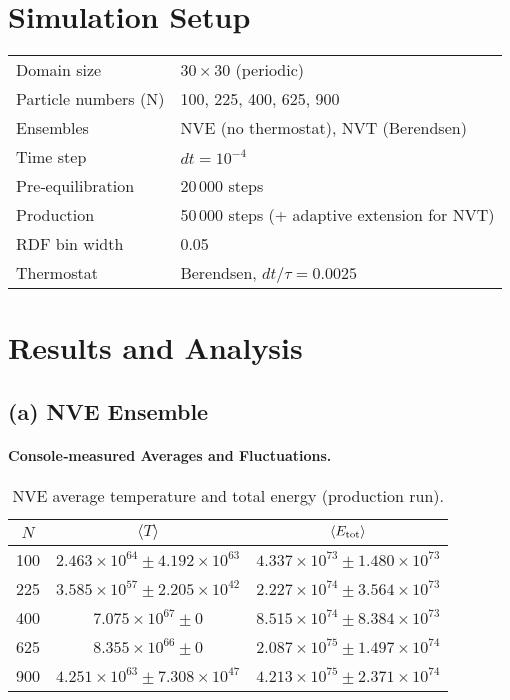 \documentclass[11pt]{article}
\begin{document}
\section{Simulation Setup}
\begin{table}[H]
\centering
\begin{tabular}{ll}
\hline
Domain size & $30\times30$ (periodic) \\
Particle numbers (N) & 100, 225, 400, 625, 900 \\
Ensembles & NVE (no thermostat), NVT (Berendsen) \\
Time step & $dt=10^{-4}$ \\
Pre‐equilibration & 20\,000 steps \\
Production & 50\,000 steps (+ adaptive extension for NVT) \\
RDF bin width & 0.05 \\
Thermostat & Berendsen, $dt/\tau=0.0025$ \\
\hline
\end{tabular}
\end{table}

\section{Results and Analysis}

\subsection{(a) NVE Ensemble}
\paragraph{Console‐measured Averages and Fluctuations.}
\begin{table}[H]
\centering
\caption{NVE average temperature and total energy (production run).}
\begin{tabular}{c|cc}
\hline
$N$ & $\langle T\rangle$ & $\langle E_{\rm tot}\rangle$ \\
\hline
100 & $2.463\times10^{64}\pm4.192\times10^{63}$ 
    & $4.337\times10^{73}\pm1.480\times10^{73}$ \\
225 & $3.585\times10^{57}\pm2.205\times10^{42}$ 
    & $2.227\times10^{74}\pm3.564\times10^{73}$ \\
400 & $7.075\times10^{67}\pm0$ 
    & $8.515\times10^{74}\pm8.384\times10^{73}$ \\
625 & $8.355\times10^{66}\pm0$ 
    & $2.087\times10^{75}\pm1.497\times10^{74}$ \\
900 & $4.251\times10^{63}\pm7.308\times10^{47}$ 
    & $4.213\times10^{75}\pm2.371\times10^{74}$ \\
\hline
\end{tabular}
\end{table}
\end{document}
